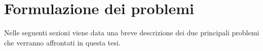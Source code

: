 \section{Formulazione dei problemi} \label{sec:descr_problemi}

Nelle seguenti sezioni viene data una breve descrizione dei due principali problemi che verranno affrontati in questa tesi.

